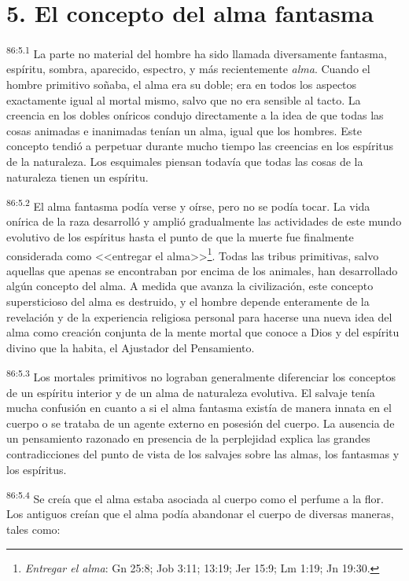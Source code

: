 \documentclass[twoside, 11pt]{book}
\begin{document}
\section*{5. El concepto del alma fantasma}
\par
\textsuperscript{86:5.1} La parte no material del hombre ha sido llamada diversamente fantasma, espíritu, sombra, aparecido, espectro, y más recientemente \textit{alma}. Cuando el hombre primitivo soñaba, el alma era su doble; era en todos los aspectos exactamente igual al mortal mismo, salvo que no era sensible al tacto. La creencia en los dobles oníricos condujo directamente a la idea de que todas las cosas animadas e inanimadas tenían un alma, igual que los hombres. Este concepto tendió a perpetuar durante mucho tiempo las creencias en los espíritus de la naturaleza. Los esquimales piensan todavía que todas las cosas de la naturaleza tienen un espíritu.

\par
\textsuperscript{86:5.2} El alma fantasma podía verse y oírse, pero no se podía tocar. La vida onírica de la raza desarrolló y amplió gradualmente las actividades de este mundo evolutivo de los espíritus hasta el punto de que la muerte fue finalmente considerada como <<entregar el alma>>\footnote{\textit{Entregar el alma}: Gn 25:8; Job 3:11; 13:19; Jer 15:9; Lm 1:19; Jn 19:30.}. Todas las tribus primitivas, salvo aquellas que apenas se encontraban por encima de los animales, han desarrollado algún concepto del alma. A medida que avanza la civilización, este concepto supersticioso del alma es destruido, y el hombre depende enteramente de la revelación y de la experiencia religiosa personal para hacerse una nueva idea del alma como creación conjunta de la mente mortal que conoce a Dios y del espíritu divino que la habita, el Ajustador del Pensamiento.

\par
\textsuperscript{86:5.3} Los mortales primitivos no lograban generalmente diferenciar los conceptos de un espíritu interior y de un alma de naturaleza evolutiva. El salvaje tenía mucha confusión en cuanto a si el alma fantasma existía de manera innata en el cuerpo o se trataba de un agente externo en posesión del cuerpo. La ausencia de un pensamiento razonado en presencia de la perplejidad explica las grandes contradicciones del punto de vista de los salvajes sobre las almas, los fantasmas y los espíritus.

\par
\textsuperscript{86:5.4} Se creía que el alma estaba asociada al cuerpo como el perfume a la flor. Los antiguos creían que el alma podía abandonar el cuerpo de diversas maneras, tales como:
\end{document}

